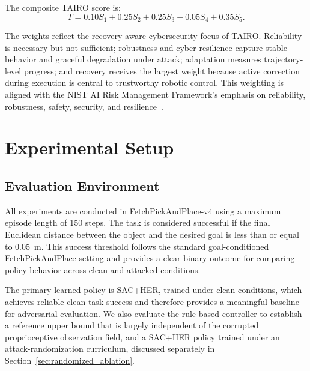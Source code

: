 \documentclass[conference]{IEEEtran}
\begin{document}
The composite TAIRO score is:
\begin{equation}
T =
0.10S_1 +
0.25S_2 +
0.25S_3 +
0.05S_4 +
0.35S_5 .
\label{eq:trustworthiness_score}
\end{equation}

The weights reflect the recovery-aware cybersecurity focus of TAIRO. Reliability is
necessary but not sufficient; robustness and cyber resilience capture stable behavior
and graceful degradation under attack; adaptation measures trajectory-level progress;
and recovery receives the largest weight because active correction during execution is
central to trustworthy robotic control. This weighting is aligned with the NIST AI Risk
Management Framework's emphasis on reliability, robustness, safety, security, and
resilience~\cite{nist2023airmf}.


\section{Experimental Setup}
\label{sec:eval}

\subsection{Evaluation Environment}

All experiments are conducted in FetchPickAndPlace-v4 using a maximum episode length of
150 steps. The task is considered successful if the final Euclidean distance between
the object and the desired goal is less than or equal to 0.05~m. This success threshold
follows the standard goal-conditioned FetchPickAndPlace setting and provides a clear
binary outcome for comparing policy behavior across clean and attacked conditions.

The primary learned policy is SAC+HER, trained under clean conditions, which achieves
reliable clean-task success and therefore provides a meaningful baseline for adversarial
evaluation. We also evaluate the rule-based controller to establish a reference upper
bound that is largely independent of the corrupted proprioceptive observation field, and
a SAC+HER policy trained under an attack-randomization curriculum, discussed separately
in Section~\ref{sec:randomized_ablation}.
\end{document}

